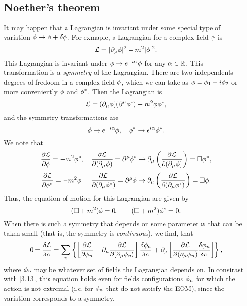 \subsection{Noether's theorem}
It may happen that a Lagrangian is invariant under some special type of variation $\phi\to \phi+\delta\phi  $. For exmaple, a Lagrangian for a complex field $\phi $ is
\begin{equation}
  \mathcal{L} = |\partial_\mu \phi |^2-m^2|\phi |^2.
\end{equation}
This Lagrangian is invariant under $\phi\to e^{-i\alpha }\phi$ for any $\alpha\in\mathbb{R}$. This transformation is a \textit{symmetry} of the Lagrangian. There are two independents degrees of fredoom in a complex field $\phi$, which we can take as $\phi=\phi_1+i\phi_2 $ or more conveniently $\phi$ and $\phi^*$. Then the Lagrangian is
\begin{equation}\label{3.19}
  \mathcal{L} =(\partial_\mu\phi )(\partial^\mu \phi^*)-m^2\phi\phi^*,
\end{equation}
and the symmetry transformations are
\begin{equation}\label{sim}
  \phi\to e^{-i\alpha }\phi,\quad \phi^*\to e^{i\alpha }\phi^*.
\end{equation}
We note that 
\begin{equation}
  \pdv{\mathcal{L}}{\phi}=-m^2\phi^*,\quad \pdv{\mathcal{L}}{(\partial_\mu\phi)}=\partial^\mu \phi^* \to \partial_\mu \left(\pdv{\mathcal{L}}{(\partial_\mu\phi)}\right)=\Box \phi^* ,
\end{equation}
\begin{equation}
  \pdv{\mathcal{L}}{\phi^* }=-m^2\phi,\quad \pdv{\mathcal{L}}{(\partial_\mu\phi^* )}=\partial^\mu \phi \to \partial_\mu \left(\pdv{\mathcal{L}}{(\partial_\mu\phi^* )}\right)=\Box \phi.
\end{equation}
Thus, the equation of motion for this Lagrangian are given by
\begin{equation}\label{eom-phi}
  (\Box +m^2)\phi=0,\qquad (\Box +m^2)\phi^*=0.
\end{equation}
When there is such a symmetry that depends on some parameter $\alpha$ that can be taken small (that is, the symmetry is \textit{continuous}), we find, that
\begin{equation}\label{3.22}
  0=\frac{\delta \mathcal{L}}{\delta\alpha }=\sum_n\left\{\left[\pdv{\mathcal{L}}{\phi_n}-\partial_\mu \pdv{\mathcal{L}}{(\partial_\mu\phi_n )}\right]\frac{\delta\phi_n}{\delta\alpha }+\partial_\mu \left[\pdv{\mathcal{L}}{(\partial_\mu\phi_n)}\frac{\delta\phi_n}{\delta\alpha }\right]\right\},
\end{equation}
where $\phi_n$ may be whatever set of fields the Lagrangian depends on. In constrast with \eqref{3.13}, this equation holds even for fields configurations $\phi_n $ for which the action is not extremal (i.e. for $\phi_n$ that do not satisfy the EOM), since the variation corresponds to a symmetry.

